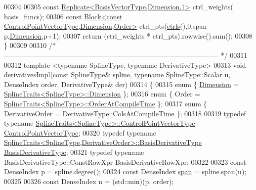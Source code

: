 \begin{DoxyCode}
00304 
00305     \textcolor{keyword}{const} \hyperlink{group___core___module_class_eigen_1_1_replicate}{Replicate<BasisVectorType,Dimension,1>} ctrl\_weights(
      basis\_funcs);
00306     \textcolor{keyword}{const} \hyperlink{group___core___module_class_eigen_1_1_block}{Block<const ControlPointVectorType,Dimension,Order>}
       ctrl\_pts(\hyperlink{group___splines___module_a0fc81e475d3a0ba34da1bd97f2e8fbc7}{ctrls}(),0,span-p,\hyperlink{group___splines___module_a82c233f1d4719bc52397d64a6c96c5b0a25366e5e79da5355d259a71096d8d8a7}{Dimension},p+1);
00307     \textcolor{keywordflow}{return} (ctrl\_weights * ctrl\_pts).rowwise().sum();
00308   \}
00309 
00310   \textcolor{comment}{/* --------------------------------------------------------------------------------------------- */}
00311 
00312   \textcolor{keyword}{template} <\textcolor{keyword}{typename} SplineType, \textcolor{keyword}{typename} DerivativeType>
00313   \textcolor{keywordtype}{void} derivativesImpl(\textcolor{keyword}{const} SplineType& spline, \textcolor{keyword}{typename} SplineType::Scalar u, DenseIndex order, 
      DerivativeType& der)
00314   \{    
00315     \textcolor{keyword}{enum} \{ \hyperlink{group___splines___module_a82c233f1d4719bc52397d64a6c96c5b0a25366e5e79da5355d259a71096d8d8a7}{Dimension} = \hyperlink{struct_eigen_1_1_spline_traits}{SplineTraits<SplineType>::Dimension} \};
00316     \textcolor{keyword}{enum} \{ Order = \hyperlink{struct_eigen_1_1_spline_traits}{SplineTraits<SplineType>::OrderAtCompileTime}
       \};
00317     \textcolor{keyword}{enum} \{ DerivativeOrder = DerivativeType::ColsAtCompileTime \};
00318 
00319     \textcolor{keyword}{typedef} \textcolor{keyword}{typename} \hyperlink{struct_eigen_1_1_spline_traits}{SplineTraits<SplineType>::ControlPointVectorType}
       \hyperlink{group___splines___module_ac42c673462a98ad1779761bebeb450bf}{ControlPointVectorType};
00320     \textcolor{keyword}{typedef} \textcolor{keyword}{typename} 
      \hyperlink{struct_eigen_1_1_spline_traits}{SplineTraits<SplineType,DerivativeOrder>::BasisDerivativeType}
       \hyperlink{group___splines___module_a9db0b0108353660cd03524f2e67d6b3c}{BasisDerivativeType};
00321     \textcolor{keyword}{typedef} \textcolor{keyword}{typename} BasisDerivativeType::ConstRowXpr BasisDerivativeRowXpr;    
00322 
00323     \textcolor{keyword}{const} DenseIndex p = spline.degree();
00324     \textcolor{keyword}{const} DenseIndex \hyperlink{group___splines___module_ab62751802b4cc237aadb0dbf3455df98}{span} = spline.span(u);
00325 
00326     \textcolor{keyword}{const} DenseIndex n = (std::min)(p, order);

\end{DoxyCode}
